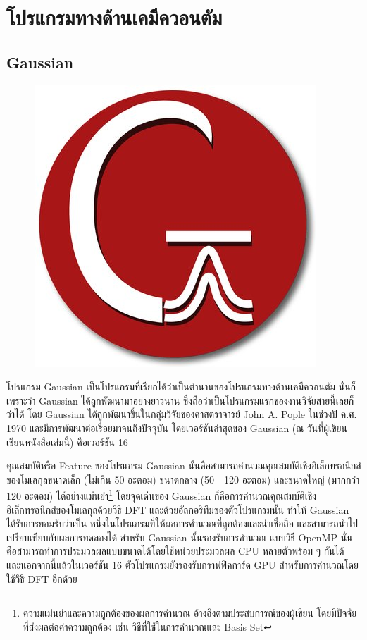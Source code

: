 

\chapter{โปรแกรมทางด้านเคมีควอนตัม}
\label{ch:qm_software}

\section{Gaussian}
\label{sec:software_gaussian}

\begin{figure}[H]
    \centering
    \includegraphics[width=0.25\linewidth]{fig/logo_gaussian.jpg}
    \label{fig:logo_gaussian}
\end{figure}

โปรแกรม Gaussian เป็นโปรแกรมที่เรียกได้ว่าเป็นตำนานของโปรแกรมทางด้านเคมีควอนตัม นั่นก็เพราะว่า Gaussian ได้ถูกพัฒนามาอย่างยาวนาน 
ซึ่งถือว่าเป็นโปรแกรมแรกของงานวิจัยสายนี้เลยก็ว่าได้ โดย Gaussian ได้ถูกพัฒนาขึ้นในกลุ่มวิจัยของศาสตราจารย์ John A. Pople ในช่วงปี ค.ศ.
1970 และมีการพัฒนาต่อเรื่อยมาจนถึงปัจจุบัน โดยเวอร์ชันล่าสุดของ Gaussian (ณ วันที่ผู้เขียนเขียนหนังสือเล่มนี้) คือเวอร์ชัน 16\autocite{g16}

คุณสมบัติหรือ Feature ของโปรแกรม Gaussian นั้นคือสามารถคำนวณคุณสมบัติเชิงอิเล็กทรอนิกส์ของโมเลกุลขนาดเล็ก (ไม่เกิน 50 อะตอม) 
ขนาดกลาง (50 - 120 อะตอม) และขนาดใหญ่ (มากกว่า 120 อะตอม) ได้อย่างแม่นยำ\footnote{ความแม่นยำและความถูกต้องของผลการคำนวณ%
อ้างอิงตามประสบการณ์ของผู้เขียน โดยมีปัจจัยที่ส่งผลต่อค่าความถูกต้อง เช่น วิธีที่ใช้ในการคำนวณและ Basis Set} โดยจุดเด่นของ Gaussian 
ก็คือการคำนวณคุณสมบัติเชิงอิเล็กทรอนิกส์ของโมเลกุลด้วยวิธี DFT และด้วยอัลกอริทึมของตัวโปรแกรมนั้น ทำให้ Gaussian ได้รับการยอมรับว่าเป็น%
หนึ่งในโปรแกรมที่ให้ผลการคำนวณที่ถูกต้องและน่าเชื่อถือ และสามารถนำไปเปรียบเทียบกับผลการทดลองได้ สำหรับ Gaussian นั้นรองรับการคำนวณ%
แบบวิธี OpenMP นั่นคือสามารถทำการประมวลผลแบบขนาดได้โดยใช้หน่วยประมวลผล CPU หลายตัวพร้อม ๆ กันได้ และนอกจากนี้แล้วในเวอร์ชัน 16
ตัวโปรแกรมยังรองรับกราฟฟิคการ์ด GPU สำหรับการคำนวณโดยใช้วิธี DFT อีกด้วย 

